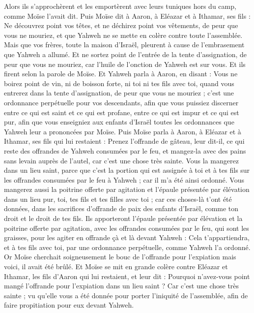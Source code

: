 \begin{multicols}{2}
Alors ils s'approchèrent et les emportèrent avec leurs tuniques hors du camp, comme Moïse l'avait dit.
Puis Moïse dit à Aaron, à Eléazar et à Ithamar, ses fils : Ne découvrez point vos têtes, et ne déchirez point vos vêtements, de peur que vous ne mouriez, et que Yahweh ne se mette en colère contre toute l'assemblée. Mais que vos frères, toute la maison d'Israël, pleurent à cause de l'embrasement que Yahweh a allumé.
Et ne sortez point de l'entrée de la tente d'assignation, de peur que vous ne mouriez, car l'huile de l'onction de Yahweh est sur vous. Et ils firent selon la parole de Moïse.
Et Yahweh parla à Aaron, en disant :
Vous ne boirez point de vin, ni de boisson forte, ni toi ni tes fils avec toi, quand vous entrerez dans la tente d'assignation, de peur que vous ne mouriez ; c'est une ordonnance perpétuelle pour vos descendants,
afin que vous puissiez discerner entre ce qui est saint et ce qui est profane, entre ce qui est impur et ce qui est pur,
afin que vous enseigniez aux enfants d'Israël toutes les ordonnances que Yahweh leur a prononcées par Moïse.
Puis Moïse parla à Aaron, à Eléazar et à Ithamar, ses fils qui lui restaient : Prenez l'offrande de gâteau, leur dit-il, ce qui reste des offrandes de Yahweh consumées par le feu, et mangez-la avec des pains sans levain auprès de l'autel, car c'est une chose très sainte.
Vous la mangerez dans un lieu saint, parce que c'est la portion qui est assignée à toi et à tes fils sur les offrandes consumées par le feu à Yahweh ; car il m'a été ainsi ordonné.
Vous mangerez aussi la poitrine offerte par agitation et l'épaule présentée par élévation dans un lieu pur, toi, tes fils et tes filles avec toi ; car ces choses-là t'ont été données, dans les sacrifices d'offrande de paix des enfants d'Israël, comme ton droit et le droit de tes fils.
Ils apporteront l'épaule présentée par élévation et la poitrine offerte par agitation, avec les offrandes consumées par le feu, qui sont les graisses, pour les agiter en offrande çà et là devant Yahweh : Cela t'appartiendra, et à tes fils avec toi, par une ordonnance perpétuelle, comme Yahweh l'a ordonné.
Or Moïse cherchait soigneusement le bouc de l'offrande pour l'expiation mais voici, il avait été brûlé. Et Moïse se mit en grande colère contre Eléazar et Ithamar, les fils d'Aaron qui lui restaient, et leur dit :
Pourquoi n'avez-vous point mangé l'offrande pour l'expiation dans un lieu saint ? Car c'est une chose très sainte ; vu qu'elle vous a été donnée pour porter l'iniquité de l'assemblée, afin de faire propitiation pour eux devant Yahweh.

\end{multicols}
